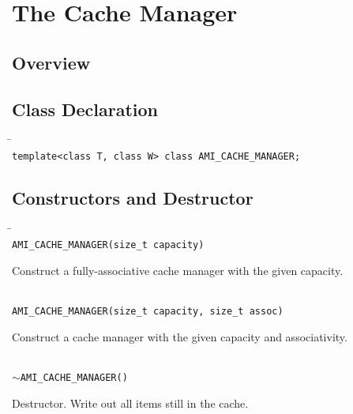 \chapter{The Cache Manager}

\section{Overview}
\label{cache:overview}

\section{Class Declaration}

   \begin{tabbing}
   \hspace*{.3in} \= \hspace{.5in} \= \\

   \> {\tt template<class T, class W> class AMI\_CACHE\_MANAGER;}
   \end{tabbing}

\section{Constructors and Destructor}
   \begin{tabbing}
   \hspace*{.3in} \= \hspace{.5in} \= \\

   \> {\tt AMI\_CACHE\_MANAGER(size\_t capacity)}\\ 
   \>\>\parbox[t]{5.5in}{Construct a fully-associative cache manager with the given capacity.}\\[3mm]

   \> {\tt AMI\_CACHE\_MANAGER(size\_t capacity, size\_t assoc)}\\ 
   \>\>\parbox[t]{5.5in}{Construct a cache manager with the given capacity and associativity.}\\[3mm]

   \> {\tt $\sim$AMI\_CACHE\_MANAGER()}\\ 
   \>\>\parbox[t]{5.5in}{Destructor. Write out all items still in the cache.}\\[3mm]

   \end{tabbing}

